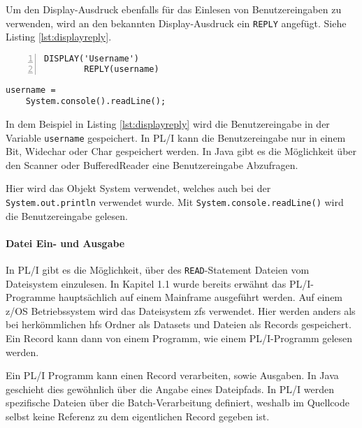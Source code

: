 Um den Display-Ausdruck ebenfalls für das Einlesen von Benutzereingaben zu verwenden, wird an den bekannten Display-Ausdruck ein \verb+REPLY+ angefügt. Siehe Listing \ref{lst:displayreply}.

\begin{minipage}[b]{0.48\linewidth}
	\centering
	\lstset{language=PL/I,label=SliceExaple}
	\begin{lstlisting}[frame=single, numbers=left, mathescape,%
		caption={Standardeingabe}, label={lst:displayreply}]
		DISPLAY('Username') 
		REPLY(username)
	\end{lstlisting}
\end{minipage}
\hspace{0.5cm}
\begin{minipage}[b]{0.48\linewidth}
	\centering
	\lstset{language=Java,label=SliceExaple}
	\begin{lstlisting}[frame=single, mathescape,%
		title={" "}]
	username = 
	System.console().readLine(); 
	\end{lstlisting}
\end{minipage} 

In dem Beispiel in Listing \ref{lst:displayreply} wird die Benutzereingabe in der
Variable \verb+username+ gespeichert.
In PL/I kann die Benutzereingabe nur in einem Bit, Widechar oder Char gespeichert werden. 
In Java gibt es die Möglichkeit über den Scanner oder BufferedReader eine Benutzereingabe Abzufragen.

Hier wird das Objekt System verwendet, welches auch bei der \verb+System.out.println+ verwendet wurde.
Mit \verb+System.console.readLine()+ wird die Benutzereingabe gelesen.

\paragraph{Datei Ein- und Ausgabe}
In PL/I gibt es die Möglichkeit, über des \verb+READ+-Statement Dateien vom Dateisystem einzulesen.
In Kapitel 1.1 wurde bereits erwähnt das PL/I-Programme hauptsächlich auf einem Mainframe ausgeführt werden.
Auf einem z/OS Betriebssystem wird das Dateisystem \ac{zfs} verwendet.
Hier werden anders als bei herkömmlichen \ac{hfs} Ordner als Datasets und Dateien als Records gespeichert.
Ein Record kann dann von einem Programm, wie einem PL/I-Programm gelesen werden.

Ein PL/I Programm kann einen Record verarbeiten, sowie Ausgaben. In Java geschieht dies gewöhnlich über die Angabe eines Dateipfads.
In PL/I werden spezifische Dateien über die Batch-Verarbeitung definiert, weshalb im Quellcode selbst keine Referenz zu dem eigentlichen Record gegeben ist.

